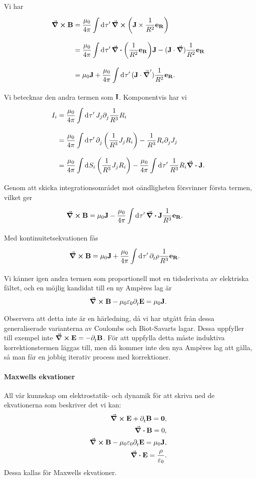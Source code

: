 Vi har
\begin{align*}
	\curl{\vb{B}} &= \frac{\mu_{0}}{4\pi}\int\limits_{}^{}\dd[]{\tau'}\curl(\vb{J}\times\frac{1}{R^{2}}\vb{e}_{\vb{R}}) \\
	              &= \frac{\mu_{0}}{4\pi}\int\limits_{}^{}\dd[]{\tau'}\div(\frac{1}{R^{2}}\vb{e}_{\vb{R}})\vb{J} - (\vb{J}\cdot\grad)\frac{1}{R^{2}}\vb{e}_{\vb{R}} \\
	              &= \mu_{0}\vb{J} + \frac{\mu_{0}}{4\pi}\int\limits_{}^{}\dd[]{\tau'}(\vb{J}\cdot\grad')\frac{1}{R^{2}}\vb{e}_{\vb{R}}.
\end{align*}
Vi betecknar den andra termen som $\vb{I}$. Komponentvis har vi
\begin{align*}
	I_{i} &= \frac{\mu_{0}}{4\pi}\int\limits_{}^{}\dd[]{\tau'}J_{j}\partial_{j}^{}\frac{1}{R^{3}}R_{i} \\
	      &= \frac{\mu_{0}}{4\pi}\int\limits_{}^{}\dd[]{\tau'}\partial_{j}^{}\left(\frac{1}{R^{3}}J_{j}R_{i}\right) - \frac{1}{R^{3}}R_{i}\partial_{j}^{}J_{j} \\
	      &= \frac{\mu_{0}}{4\pi}\int\limits_{}^{}\dd[]{S_{i}}\left(\frac{1}{R^{3}}J_{j}R_{i}\right) - \frac{\mu_{0}}{4\pi}\int\limits_{}^{}\dd[]{\tau'}\frac{1}{R^{3}}R_{i}\div{\vb{J}}.
\end{align*}
Genom att skicka integrationsområdet mot oändligheten försvinner första termen, vilket ger
\begin{align*}
	\curl{\vb{B}} &= \mu_{0}\vb{J} - \frac{\mu_{0}}{4\pi}\int\limits_{}^{}\dd[]{\tau'}\div{\vb{J}}\frac{1}{R^{3}}\vb{e}_{\vb{R}}.
\end{align*}
Med kontinuitetsekvationen fås
\begin{align*}
	\curl{\vb{B}} &= \mu_{0}\vb{J} + \frac{\mu_{0}}{4\pi}\int\limits_{}^{}\dd[]{\tau'}\partial_{t}^{}\rho\frac{1}{R^{3}}\vb{e}_{\vb{R}}.
\end{align*}
Vi känner igen andra termen som proportionell mot en tidsderivata av elektriska fältet, och en möjlig kandidat till en ny Ampères lag är
\begin{align*}
	\curl{\vb{B}} - \mu_{0}\varepsilon_{0}\partial_{t}^{}\vb{E} = \mu_{0}\vb{J}.
\end{align*}

Observera att detta inte är en härledning, då vi har utgått från dessa generaliserade varianterna av Coulombs och Biot-Savarts lagar. Dessa uppfyller till exempel inte $\curl{\vb{E}} = -\partial_{t}^{}\vb{B}$. För att uppfylla detta måste induktiva korrektionstermen läggas till, men då kommer inte den nya Ampères lag att gälla, så man får en jobbig iterativ process med korrektioner.

\paragraph{Maxwells ekvationer}
All vår kunnskap om elektrostatik- och dynamik för att skriva ned de ekvationerna som beskriver det vi kan:
\begin{align*}
	\curl{\vb{E}} + \partial_{t}^{}\vb{B} = \vb{0}, \\
	\div{\vb{B}} = 0, \\
	\curl{\vb{B}} - \mu_{0}\varepsilon_{0}\partial_{t}^{}\vb{E} = \mu_{0}\vb{J}, \\
	\div{\vb{E}} = \frac{\rho}{\varepsilon_{0}}.
\end{align*}
Dessa kallas för Maxwells ekvationer.

